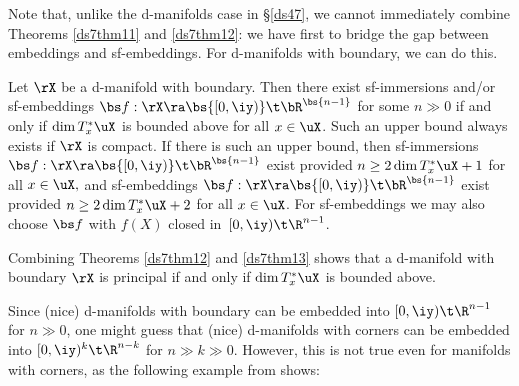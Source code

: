\documentclass{article}
\begin{document}
Note that, unlike the d-manifolds case in \S\ref{ds47}, we cannot
immediately combine Theorems \ref{ds7thm11} and \ref{ds7thm12}: we
have first to bridge the gap between embeddings and sf-embeddings.
For d-manifolds with boundary, we can do this.

\begin{thm} Let\/ $\rX$ be a d-manifold with boundary. Then there
exist sf-immersions and/or sf-embeddings $\bs f:\rX\ra\bs{[0,\iy)}
\t\bR^{\bs{n-1}}$ for some $n\gg 0$ if and only if\/ $\dim T^*_x\uX$
is bounded above for all\/ $x\in\uX$. Such an upper bound always
exists if\/ $\rX$ is compact. If there is such an upper bound, then
sf-immersions $\bs f:\rX\ra\bs{[0,\iy)} \t\bR^{\bs{n-1}}$ exist
provided\/ $n\ge 2\dim T_x^*\uX+1$ for all\/ $x\in\uX,$ and
sf-embeddings $\bs f:\rX\ra\bs{[0,\iy)} \t\bR^{\bs{n-1}}$ exist
provided\/ $n\ge 2\dim T_x^*\uX+2$ for all\/ $x\in\uX$. For
sf-embeddings we may also choose $\bs f$ with\/ $f(X)$ closed
in\/~$[0,\iy)\t\R^{n-1}$.
\label{ds7thm13}
\end{thm}

Combining Theorems \ref{ds7thm12} and \ref{ds7thm13} shows that a
d-manifold with boundary $\rX$ is principal if and only if $\dim
T^*_x\uX$ is bounded above.

Since (nice) d-manifolds with boundary can be embedded into
$[0,\iy)\t\R^{n-1}$ for $n\gg 0$, one might guess that (nice)
d-manifolds with corners can be embedded into $[0,\iy)^k\t\R^{n-k}$
for $n\gg k\gg 0$. However, this is not true even for manifolds with
corners, as the following example from \cite[\S 5.7]{Joyc6} shows:
\end{document}
